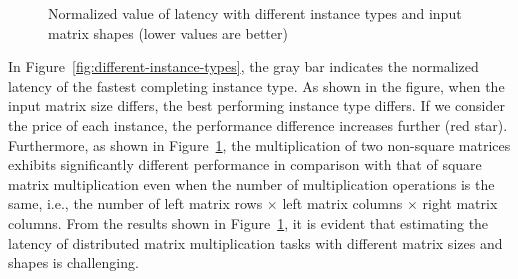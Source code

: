 \documentclass[10pt, conference, compsocconf]{IEEEtran}
\begin{document}
\begin{figure}[t]
  \centering
  \hfil\hfil\hfil\hfil\hfil\hfil\hfil\hfil\hfil\hfil{}
  \caption{\label{fig:instance-blocks-sizes-compare}Normalized value of latency with different instance types and input matrix shapes (lower values are better)}
\end{figure}

In Figure~\ref{fig:different-instance-types}, the gray bar indicates the normalized latency of the fastest completing instance type. As shown in the figure, when the input matrix size differs, the best performing instance type differs. If we consider the price of each instance, the performance difference increases further (red star). Furthermore, as shown in Figure~\ref{fig:instance-blocks-sizes-compare}, the multiplication of two non-square matrices exhibits significantly different performance in comparison with that of square matrix multiplication even when the number of multiplication operations is the same, i.e., the number of left matrix rows $\times$ left matrix columns $\times$ right matrix columns. From the results shown in Figure~\ref{fig:instance-blocks-sizes-compare}, it is evident that estimating the latency of distributed matrix multiplication tasks with different matrix sizes and shapes is challenging.
\end{document}

